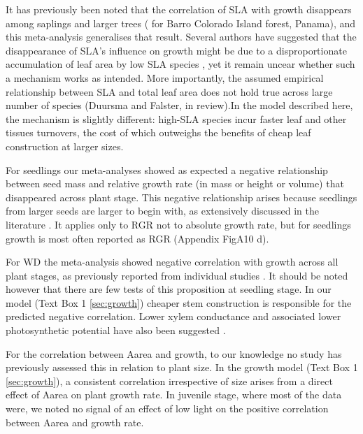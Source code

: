 \documentclass[a4paper]{article}\usepackage[]{graphicx}\usepackage[]{color}
\begin{document}
It has previously been noted that the correlation of SLA with growth disappears among saplings and larger trees (\citealt{Wright:2010tp} for Barro Colorado Island forest, Panama), and this meta-analysis generalises that result. Several authors have suggested that the disappearance of SLA's influence on growth might be due to a disproportionate accumulation of leaf area by low SLA species \citep{Reich:1992wm,Poorter:2008iu,Wright:2010tp}, yet it remain uncear whether such a mechanism works as intended. More importantly, the assumed empirical relationship between SLA and total leaf area does not hold true across large number of species (Duursma and Falster, in review).In the model described here, the mechanism is slightly different: high-SLA species incur faster leaf and other tissues turnovers, the cost of which outweighs the benefits of cheap leaf construction at larger sizes.

For seedlings our meta-analyses showed as expected a negative relationship between seed mass and relative growth rate (in mass or height or volume) that disappeared across plant stage. This negative relationship arises because seedlings from larger seeds are larger to begin with, as extensively discussed in the literature \citep[reviewed by][]{Turnbull:2012ew}. It applies only to RGR not to absolute growth rate, but for seedlings growth is most often reported as RGR (Appendix FigA10 d).

For WD the meta-analysis showed negative correlation with growth across all plant stages, as previously reported from individual studies \citep{Wright:2010tp,Ruger:2012jv}. It should be noted however that there are few tests of this proposition at seedling stage. In our model (Text Box 1 \ref{sec:growth}) cheaper stem construction is responsible for the predicted negative correlation. Lower xylem conductance and associated lower photosynthetic potential have also been suggested \citep[reviewed by][]{Chave:2009iy}. 

For the correlation between Aarea and growth, to our knowledge no study has previously assessed this in relation to plant size. In the growth model (Text Box 1 \ref{sec:growth}), a consistent correlation irrespective of size arises from a direct effect of Aarea on plant growth rate. In juvenile stage, where most of the data were, we noted no signal of an effect of low light on the positive correlation between Aarea and growth rate.
\end{document}
